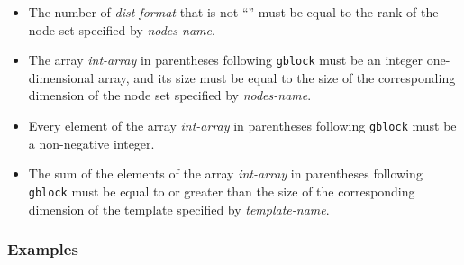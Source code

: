 \begin{itemize}
\item The number of {\it dist-format} that is not ``{\tt *}'' must be
      equal to the rank of the node set specified by {\it nodes-name}.  
\item The array {\it int-array} in parentheses following {\tt gblock}
      must be an integer one-dimensional array, and its size must be
      equal to the size of the corresponding dimension of the node set
      specified by {\it nodes-name}.
\item Every element of the array {\it int-array} in parentheses
      following {\tt gblock} must be a non-negative integer.
\item The sum of the elements of the array {\it int-array} in 
      parentheses following {\tt gblock} must be equal to or greater
      than the size of the corresponding dimension of the template
      specified by {\it template-name}.
\end{itemize}

\subsubsection*{Examples}

